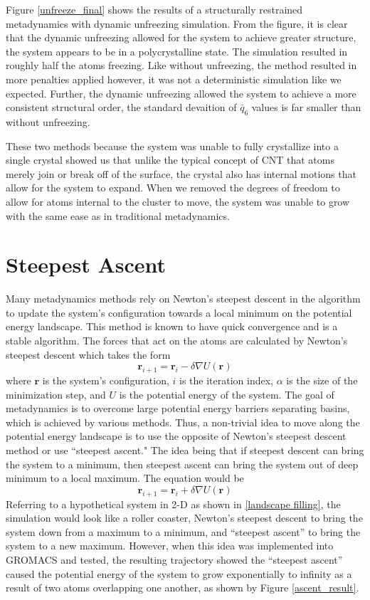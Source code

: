 Figure \ref{unfreeze_final} shows the results of a structurally restrained metadynamics with dynamic unfreezing simulation.  From the figure, it is clear that the dynamic unfreezing allowed for the system to achieve greater structure, the system appears to be in a polycrystalline state.  The simulation resulted in roughly half the atoms freezing.  Like without unfreezing, the method resulted in more penalties applied however, it was not a deterministic simulation like we expected.  Further, the dynamic unfreezing allowed the system to achieve a more consistent structural order, the standard devaition of $\bar{q}_6$ values is far smaller than without unfreezing.  

These two methods because the system was unable to fully crystallize into a single crystal showed us that unlike the typical concept of CNT that atoms merely join or break off of the surface, the crystal also has internal motions that allow for the system to expand.  When we removed the degrees of freedom to allow for atoms internal to the cluster to move, the system was unable to grow with the same ease as in traditional metadynamics.  


\section{Steepest Ascent}
Many metadynamics methods rely on Newton's steepest descent in the algorithm to update the system's configuration towards a local minimum on the potential energy landscape.  This method is known to have quick convergence and is a stable algorithm.  The forces that act on the atoms are calculated by Newton's steepest descent which takes the form
\begin{equation}
\mathbf{r}_{i+1} = \mathbf{r}_{i} - \delta \nabla U(\mathbf{r})
\end{equation}
where $\mathbf{r}$ is the system's configuration, $i$ is the iteration index, $\alpha$ is the size of the minimization step, and $U$ is the potential energy of the system.  The goal of metadynamics is to overcome large potential energy barriers separating basins, which is achieved by various methods.  Thus, a non-trivial idea to move along the potential energy landscape is to use the opposite of Newton's steepest descent method or use ``steepest ascent."  The idea being that if steepest descent can bring the system to a minimum, then steepest ascent can bring the system out of deep minimum to a local maximum.  The equation would be
\begin{equation}
	\mathbf{r}_{i+1} = \mathbf{r}_{i} + \delta \nabla U(\mathbf{r})
\end{equation}
Referring to a hypothetical system in 2-D as shown in \ref{landscape filling}, the simulation would look like a roller coaster, Newton's steepest descent to bring the system down from a maximum to a minimum, and ``steepest ascent'' to bring the system to a new maximum. However, when this idea was implemented into GROMACS \cite{GROMACS} and tested, the resulting trajectory showed the ``steepest ascent'' caused the potential energy of the system to grow exponentially to infinity as a result of two atoms overlapping one another, as shown by Figure \ref{ascent_result}.

